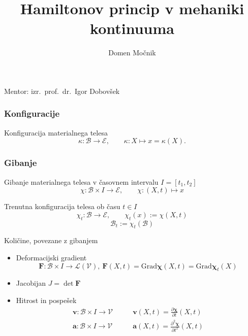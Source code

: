 \documentclass{beamer}
\title{Hamiltonov princip v mehaniki kontinuuma}
\author{Domen Mo\v{c}nik}
\newcommand{\E}{\mathscr E} %
\newcommand{\V}{\mathscr V} %
\renewcommand{\L}{\mathscr L} %
\newcommand{\B}{\mathcal B} %
\newcommand{\vek}[1]{\boldsymbol #1} %
\newcommand{\ten}[1]{\mathbf #1} %
\newcommand{\Grad}{\mathrm{Grad}} %
\begin{document}
\begin{frame}%
\titlepage
\begin{center}Mentor: izr.~prof.~dr.~Igor Dobov\v{s}ek\end{center}
\end{frame}


\begin{frame}
\frametitle{Konfiguracije}

\begin{block}{Konfiguracija materialnega telesa}
	\[ \kappa\colon \B\to\E,\qquad \kappa\colon X\mapsto x=\kappa(X). \]
\end{block}

\begin{figure}[h]
 \begin{center}
	\scalebox{.5}{}
 \end{center}
\end{figure}

\end{frame}


\begin{frame}
\frametitle{Gibanje}

\begin{block}{Gibanje materialnega telesa \tiny{v časovnem intervalu $I=[t_1,t_2]$}}
	\begin{equation*}
		\chi\colon\B\times I\to\E,\qquad \chi\colon(X,t)\mapsto x
	\end{equation*}
\end{block}

\begin{block}{Trenutna konfiguracija telesa ob času $t\in I$}
	\[ \chi_t\colon\B\to\E,\qquad \chi_t(x):=\chi(X,t) \]
	\tiny{\[\B_t:=\chi_t(\B)\]}
\end{block}

\begin{figure}[h]
 \begin{center}
	\scalebox{.5}{}
 \end{center}
\end{figure}

\end{frame}


\begin{frame}{Količine, povezane z gibanjem}

\begin{itemize}
	\item Deformacijski gradient
	\[
		\ten{F}\colon \B\times I\to\L(\V),\ \ten{F}(X,t)=\Grad\vek{\chi}(X,t)=\Grad\vek{\chi}_t(X)
	\]
	\item Jacobijan $J=\det\ten{F}$
	\item Hitrost in pospešek
	\begin{align*}
		\vek{v}\colon \B\times I\to \V \qquad & \vek{v}(X,t) = \frac{\partial\vek{\chi}}{\partial t}(X,t) \\
		\vek{a}\colon \B\times I\to \V \qquad & \vek{a}(X,t) = \frac{\partial^2\vek{\chi}}{\partial t^2}(X,t)
	\end{align*}
\end{itemize}

\end{frame}
\end{document}
